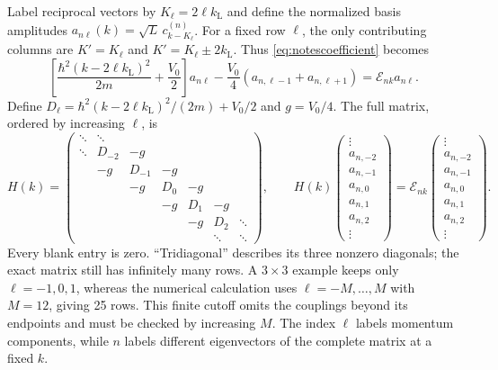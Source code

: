\documentclass[11pt,oneside]{report}
\numberwithin{equation}{chapter}
\begin{document}
Label reciprocal vectors by $K_\ell=2\ell k_{\mathrm L}$ and define the normalized basis amplitudes $a_{n\ell}(k)=\sqrt L\,c^{(n)}_{k-K_\ell}$. For a fixed row $\ell$, the only contributing columns are $K'=K_\ell$ and $K'=K_\ell\pm2k_{\mathrm L}$. Thus \cref{eq:notescoefficient} becomes
\begin{equation}\label{eq:pwmat}
 \boxed{\left[\frac{\hbar^2(k-2\ell k_{\mathrm L})^2}{2m}+\frac{V_0}{2}\right]a_{n\ell}
 -\frac{V_0}{4}(a_{n,\ell-1}+a_{n,\ell+1})=\mathcal E_{nk}a_{n\ell}.}
\end{equation}
Define $D_\ell=\hbar^2(k-2\ell k_{\mathrm L})^2/(2m)+V_0/2$ and $g=V_0/4$.
The full matrix, ordered by increasing $\ell$, is
\begin{equation}
 H(k)=\begin{pmatrix}
 \ddots&\ddots&&&&&\\
 \ddots&D_{-2}&-g&&&&\\
 &-g&D_{-1}&-g&&&\\
 &&-g&D_0&-g&&\\
 &&&-g&D_1&-g&\\
 &&&&-g&D_2&\ddots\\
 &&&&&\ddots&\ddots
 \end{pmatrix},\qquad
 H(k)\begin{pmatrix}\vdots\\a_{n,-2}\\a_{n,-1}\\a_{n,0}\\a_{n,1}\\a_{n,2}\\\vdots\end{pmatrix}
 =\mathcal E_{nk}\begin{pmatrix}\vdots\\a_{n,-2}\\a_{n,-1}\\a_{n,0}\\a_{n,1}\\a_{n,2}\\\vdots\end{pmatrix}.
\end{equation}
Every blank entry is zero. ``Tridiagonal'' describes its three nonzero diagonals; the exact matrix still has infinitely many rows. A $3\times3$ example keeps only $\ell=-1,0,1$, whereas the numerical calculation uses $\ell=-M,\ldots,M$ with $M=12$, giving 25 rows. This finite cutoff omits the couplings beyond its endpoints and must be checked by increasing $M$. The index $\ell$ labels momentum components, while $n$ labels different eigenvectors of the complete matrix at a fixed $k$.
\end{document}
